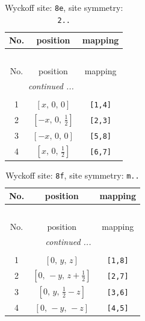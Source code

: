 \documentclass[fleqn,8pt]{jsarticle}
\begin{document}
\begin{longtable}{ccc}
\caption{Wyckoff site: {\tt 8e}, site symmetry: {\tt 2..}}
 \\
 \hline \hline
No. & position & mapping \\ \hline \endfirsthead

\multicolumn{2}{l}{\tablename\ \thetable{}} \\
 \hline \hline
No. & position & mapping \\ \hline \endhead

 \hline \hline
\multicolumn{2}{r}{\footnotesize\it continued ...} \\ \endfoot

 \hline \hline
\multicolumn{2}{r}{} \\ \endlastfoot

1 & $\left[ x,\, 0,\, 0 \right]$ & {\tt [1,4]} \\ \hline
2 & $\left[ - x,\, 0,\, \frac{1}{2} \right]$ & {\tt [2,3]} \\ \hline
3 & $\left[ - x,\, 0,\, 0 \right]$ & {\tt [5,8]} \\ \hline
4 & $\left[ x,\, 0,\, \frac{1}{2} \right]$ & {\tt [6,7]} \\
\end{longtable}
\renewcommand{\arraystretch}{1.2}
\begin{longtable}{ccc}
\caption{Wyckoff site: {\tt 8f}, site symmetry: {\tt m..}}
 \\
 \hline \hline
No. & position & mapping \\ \hline \endfirsthead

\multicolumn{2}{l}{\tablename\ \thetable{}} \\
 \hline \hline
No. & position & mapping \\ \hline \endhead

 \hline \hline
\multicolumn{2}{r}{\footnotesize\it continued ...} \\ \endfoot

 \hline \hline
\multicolumn{2}{r}{} \\ \endlastfoot

1 & $\left[ 0,\, y,\, z \right]$ & {\tt [1,8]} \\ \hline
2 & $\left[ 0,\, - y,\, z + \frac{1}{2} \right]$ & {\tt [2,7]} \\ \hline
3 & $\left[ 0,\, y,\, \frac{1}{2} - z \right]$ & {\tt [3,6]} \\ \hline
4 & $\left[ 0,\, - y,\, - z \right]$ & {\tt [4,5]} \\
\end{longtable}
\end{document}
